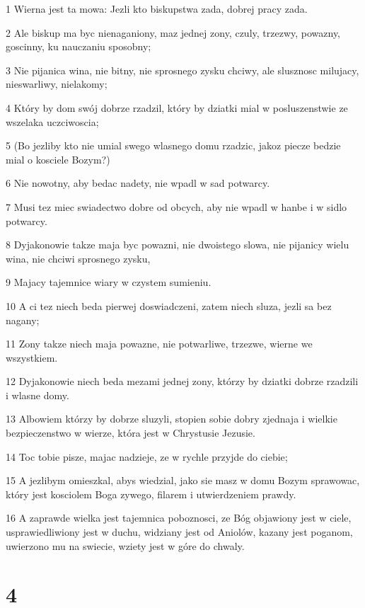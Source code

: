 \par 1 Wierna jest ta mowa: Jezli kto biskupstwa zada, dobrej pracy zada.
\par 2 Ale biskup ma byc nienaganiony, maz jednej zony, czuly, trzezwy, powazny, goscinny, ku nauczaniu sposobny;
\par 3 Nie pijanica wina, nie bitny, nie sprosnego zysku chciwy, ale slusznosc milujacy, nieswarliwy, nielakomy;
\par 4 Który by dom swój dobrze rzadzil, który by dziatki mial w posluszenstwie ze wszelaka uczciwoscia;
\par 5 (Bo jezliby kto nie umial swego wlasnego domu rzadzic, jakoz piecze bedzie mial o kosciele Bozym?)
\par 6 Nie nowotny, aby bedac nadety, nie wpadl w sad potwarcy.
\par 7 Musi tez miec swiadectwo dobre od obcych, aby nie wpadl w hanbe i w sidlo potwarcy.
\par 8 Dyjakonowie takze maja byc powazni, nie dwoistego slowa, nie pijanicy wielu wina, nie chciwi sprosnego zysku,
\par 9 Majacy tajemnice wiary w czystem sumieniu.
\par 10 A ci tez niech beda pierwej doswiadczeni, zatem niech sluza, jezli sa bez nagany;
\par 11 Zony takze niech maja powazne, nie potwarliwe, trzezwe, wierne we wszystkiem.
\par 12 Dyjakonowie niech beda mezami jednej zony, którzy by dziatki dobrze rzadzili i wlasne domy.
\par 13 Albowiem którzy by dobrze sluzyli, stopien sobie dobry zjednaja i wielkie bezpieczenstwo w wierze, która jest w Chrystusie Jezusie.
\par 14 Toc tobie pisze, majac nadzieje, ze w rychle przyjde do ciebie;
\par 15 A jezlibym omieszkal, abys wiedzial, jako sie masz w domu Bozym sprawowac, który jest kosciolem Boga zywego, filarem i utwierdzeniem prawdy.
\par 16 A zaprawde wielka jest tajemnica poboznosci, ze Bóg objawiony jest w ciele, usprawiedliwiony jest w duchu, widziany jest od Aniolów, kazany jest poganom, uwierzono mu na swiecie, wziety jest w góre do chwaly.

\chapter{4}

